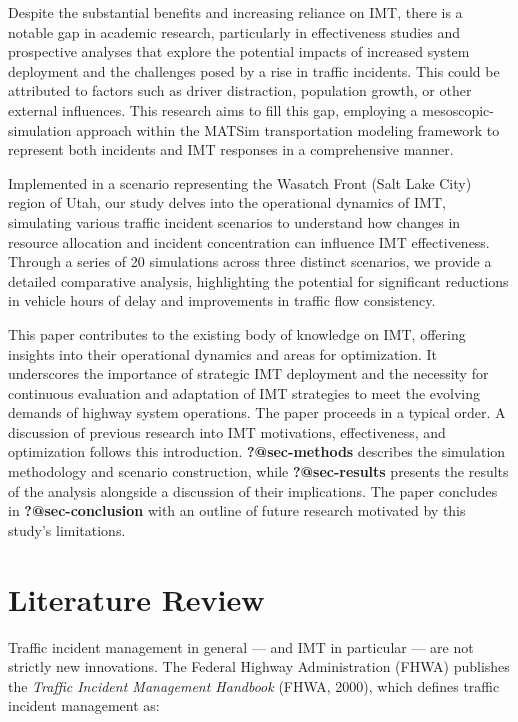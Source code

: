 \documentclass[fancy, oneside, mastersfancy, ms]{byuthesis}
\begin{document}
Despite the substantial benefits and increasing reliance on IMT, there
is a notable gap in academic research, particularly in effectiveness
studies and prospective analyses that explore the potential impacts of
increased system deployment and the challenges posed by a rise in
traffic incidents. This could be attributed to factors such as driver
distraction, population growth, or other external influences. This
research aims to fill this gap, employing a mesoscopic-simulation
approach within the MATSim transportation modeling framework to
represent both incidents and IMT responses in a comprehensive manner.

Implemented in a scenario representing the Wasatch Front (Salt Lake
City) region of Utah, our study delves into the operational dynamics of
IMT, simulating various traffic incident scenarios to understand how
changes in resource allocation and incident concentration can influence
IMT effectiveness. Through a series of 20 simulations across three
distinct scenarios, we provide a detailed comparative analysis,
highlighting the potential for significant reductions in vehicle hours
of delay and improvements in traffic flow consistency.

This paper contributes to the existing body of knowledge on IMT,
offering insights into their operational dynamics and areas for
optimization. It underscores the importance of strategic IMT deployment
and the necessity for continuous evaluation and adaptation of IMT
strategies to meet the evolving demands of highway system operations.
The paper proceeds in a typical order. A discussion of previous research
into IMT motivations, effectiveness, and optimization follows this
introduction. \textbf{?@sec-methods} describes the simulation
methodology and scenario construction, while \textbf{?@sec-results}
presents the results of the analysis alongside a discussion of their
implications. The paper concludes in \textbf{?@sec-conclusion} with an
outline of future research motivated by this study's limitations.


\hypertarget{sec-literature}{%
\chapter{Literature Review}\label{sec-literature}}

Traffic incident management in general --- and IMT in particular --- are
not strictly new innovations. The Federal Highway Administration (FHWA)
publishes the \emph{Traffic Incident Management Handbook} (FHWA, 2000),
which defines traffic incident management as:
\end{document}
